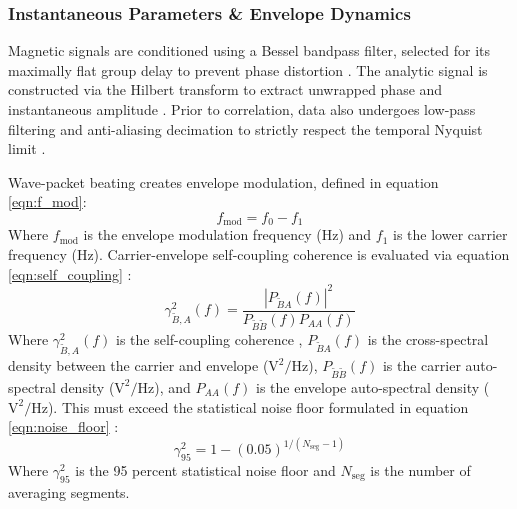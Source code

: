 \subsubsection{Instantaneous Parameters \& Envelope Dynamics}
Magnetic signals are conditioned using a Bessel bandpass filter, selected for its maximally flat group delay to prevent phase distortion \cite{zang2019observation}. The analytic signal is constructed via the Hilbert transform to extract unwrapped phase and instantaneous amplitude \cite{Fabus2021}. Prior to correlation, data also undergoes low-pass filtering and anti-aliasing decimation to strictly respect the temporal Nyquist limit \cite{Fabus2021, boashash2015time}. 

Wave-packet beating creates envelope modulation, defined in equation \ref{eqn:f_mod}:
\begin{equation}
\label{eqn:f_mod}
f_{\text{mod}} = f_0 - f_1
\end{equation}
Where $f_{\text{mod}}$ is the envelope modulation frequency ($\text{Hz}$) and $f_1$ is the lower carrier frequency ($\text{Hz}$). Carrier-envelope self-coupling coherence is evaluated via equation \ref{eqn:self_coupling} \cite{bendat2010random}:
\begin{equation}
\label{eqn:self_coupling}
\gamma_{\tilde{B}, A}^2(f) = \frac{|P_{\tilde{B} A}(f)|^2}{P_{\tilde{B}\tilde{B}}(f) P_{AA}(f)}
\end{equation}
Where $\gamma_{\tilde{B}, A}^2(f)$ is the self-coupling coherence , $P_{\tilde{B} A}(f)$ is the cross-spectral density between the carrier and envelope ($\text{V}^2/\text{Hz}$), $P_{\tilde{B}\tilde{B}}(f)$ is the carrier auto-spectral density ($\text{V}^2/\text{Hz}$), and $P_{AA}(f)$ is the envelope auto-spectral density ($\text{V}^2/\text{Hz}$). This must exceed the statistical noise floor formulated in equation \ref{eqn:noise_floor} \cite{carter1973estimation}:
\begin{equation}
\label{eqn:noise_floor}
\gamma_{95}^2 = 1 - (0.05)^{1/(N_{\text{seg}} - 1)}
\end{equation}
Where $\gamma_{95}^2$ is the 95 percent statistical noise floor and $N_{\text{seg}}$ is the number of averaging segments.

